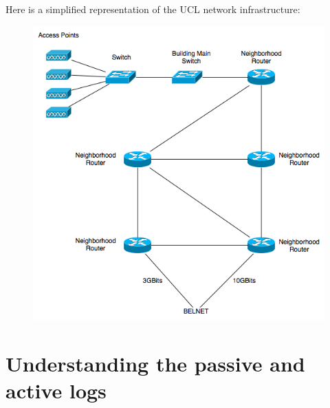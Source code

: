 Here is a simplified representation of the UCL network infrastructure:
\begin{figure}[H]
	\includegraphics[width=.9\linewidth]{Pictures/Chapter2/infrastructure.png}
\end{figure}





\section{Understanding the passive and active logs}
